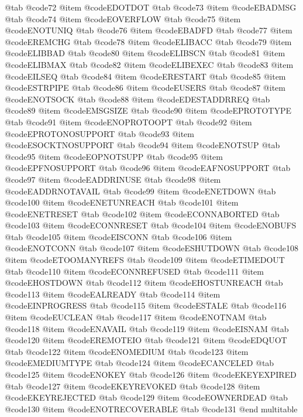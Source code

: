 @tab @code{72}
@item @code{EDOTDOT}
@tab @code{73}
@item @code{EBADMSG}
@tab @code{74}
@item @code{EOVERFLOW}
@tab @code{75}
@item @code{ENOTUNIQ}
@tab @code{76}
@item @code{EBADFD}
@tab @code{77}
@item @code{EREMCHG}
@tab @code{78}
@item @code{ELIBACC}
@tab @code{79}
@item @code{ELIBBAD}
@tab @code{80}
@item @code{ELIBSCN}
@tab @code{81}
@item @code{ELIBMAX}
@tab @code{82}
@item @code{ELIBEXEC}
@tab @code{83}
@item @code{EILSEQ}
@tab @code{84}
@item @code{ERESTART}
@tab @code{85}
@item @code{ESTRPIPE}
@tab @code{86}
@item @code{EUSERS}
@tab @code{87}
@item @code{ENOTSOCK}
@tab @code{88}
@item @code{EDESTADDRREQ}
@tab @code{89}
@item @code{EMSGSIZE}
@tab @code{90}
@item @code{EPROTOTYPE}
@tab @code{91}
@item @code{ENOPROTOOPT}
@tab @code{92}
@item @code{EPROTONOSUPPORT}
@tab @code{93}
@item @code{ESOCKTNOSUPPORT}
@tab @code{94}
@item @code{ENOTSUP}
@tab @code{95}
@item @code{EOPNOTSUPP}
@tab @code{95}
@item @code{EPFNOSUPPORT}
@tab @code{96}
@item @code{EAFNOSUPPORT}
@tab @code{97}
@item @code{EADDRINUSE}
@tab @code{98}
@item @code{EADDRNOTAVAIL}
@tab @code{99}
@item @code{ENETDOWN}
@tab @code{100}
@item @code{ENETUNREACH}
@tab @code{101}
@item @code{ENETRESET}
@tab @code{102}
@item @code{ECONNABORTED}
@tab @code{103}
@item @code{ECONNRESET}
@tab @code{104}
@item @code{ENOBUFS}
@tab @code{105}
@item @code{EISCONN}
@tab @code{106}
@item @code{ENOTCONN}
@tab @code{107}
@item @code{ESHUTDOWN}
@tab @code{108}
@item @code{ETOOMANYREFS}
@tab @code{109}
@item @code{ETIMEDOUT}
@tab @code{110}
@item @code{ECONNREFUSED}
@tab @code{111}
@item @code{EHOSTDOWN}
@tab @code{112}
@item @code{EHOSTUNREACH}
@tab @code{113}
@item @code{EALREADY}
@tab @code{114}
@item @code{EINPROGRESS}
@tab @code{115}
@item @code{ESTALE}
@tab @code{116}
@item @code{EUCLEAN}
@tab @code{117}
@item @code{ENOTNAM}
@tab @code{118}
@item @code{ENAVAIL}
@tab @code{119}
@item @code{EISNAM}
@tab @code{120}
@item @code{EREMOTEIO}
@tab @code{121}
@item @code{EDQUOT}
@tab @code{122}
@item @code{ENOMEDIUM}
@tab @code{123}
@item @code{EMEDIUMTYPE}
@tab @code{124}
@item @code{ECANCELED}
@tab @code{125}
@item @code{ENOKEY}
@tab @code{126}
@item @code{EKEYEXPIRED}
@tab @code{127}
@item @code{EKEYREVOKED}
@tab @code{128}
@item @code{EKEYREJECTED}
@tab @code{129}
@item @code{EOWNERDEAD}
@tab @code{130}
@item @code{ENOTRECOVERABLE}
@tab @code{131}
@end multitable
